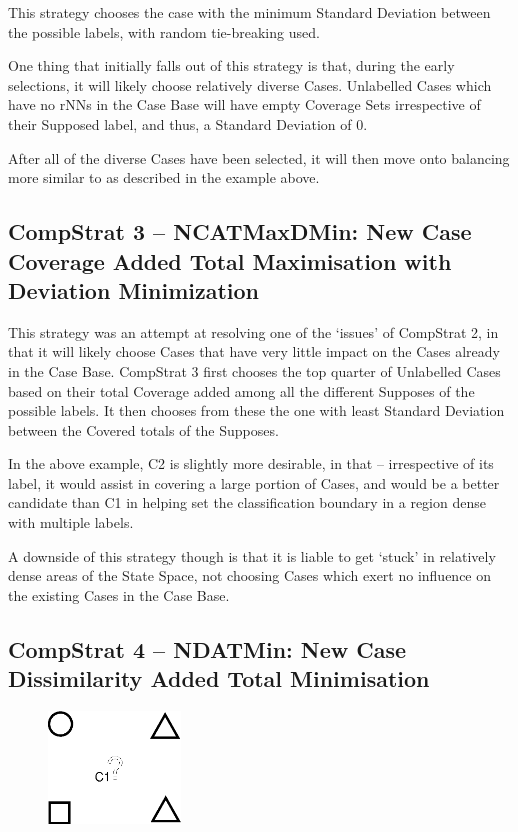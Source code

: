 \documentclass[a4paper,11pt]{report}
\begin{document}
\vspace{10pt}

This strategy chooses the case with the minimum Standard Deviation between the possible labels, with random tie-breaking used.

One thing that initially falls out of this strategy is that, during the early selections, it will likely choose relatively diverse Cases. Unlabelled Cases which have no rNNs in the Case Base will have empty Coverage Sets irrespective of their Supposed label, and thus, a Standard Deviation of 0.

After all of the diverse Cases have been selected, it will then move onto balancing more similar to as described in the example above.

\subsection{CompStrat 3 – NCATMaxDMin: New Case Coverage Added Total Maximisation with Deviation Minimization}
This strategy was an attempt at resolving one of the `issues' of CompStrat 2, in that it will likely choose Cases that have very little impact on the Cases already in the Case Base.  CompStrat 3 first chooses the top quarter of Unlabelled Cases based on their total Coverage added among all the different Supposes of the possible labels. It then chooses from these the one with least Standard Deviation between the Covered totals of the Supposes.

In the above example, C2 is slightly more desirable, in that – irrespective of its label, it would assist in covering a large portion of Cases, and would be a better candidate than C1 in helping set the classification boundary in a region dense with multiple labels.

A downside of this strategy though is that it is liable to get `stuck' in relatively dense areas of the State Space, not choosing Cases which exert no influence on the existing Cases in the Case Base.

\subsection{CompStrat 4 – NDATMin: New Case Dissimilarity Added Total Minimisation}
\begin{figure}[h!] \centering
\includegraphics[width=100pt]{./Drawn/NDATMin}
\end{figure}
\end{document}

